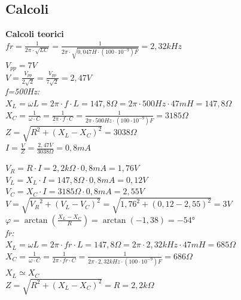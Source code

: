 \documentclass[12pt]{article}
\begin{document}
    \subsection{Calcoli}
    \begin{center}
        
    \textbf{Calcoli teorici}\\

$fr=\frac{1}{2\pi\cdot\sqrt{LC}}=\frac{1}{2\pi\cdot\sqrt{0,047 H \cdot (100 \cdot 10^{-9})F }}=2,32kHz$\\
\vspace{5mm}
$V_{pp}=7V$\\
$V=\frac{V_{pp}}{2\sqrt{2}}=\frac{V_{pp}}{7\sqrt{2}}=2,47V$\\
\vspace{10mm}
\textit{f=500Hz:}\\

\vspace{5mm}
$X_L=\omega L=2 \pi\cdot f \cdot L=147,8 \Omega=2 \pi\cdot 500Hz \cdot 47mH=147,8 \Omega$\\
$X_C=\frac{1}{\omega \cdot C}=\frac{1}{2 \pi\cdot f  \cdot C}=\frac{1}{2 \pi\cdot 500Hz  \cdot (100 \cdot 10^{-9})F}=3185 \Omega$\\
$Z=\sqrt{R^2+(X_L-X_C)^2}=3038\Omega$\\


\vspace{5mm}
$I=\frac{V}{Z}=\frac{2,47V}{3038\Omega}=0,8mA$\\

\vspace{5mm}

$V_R=R\cdot I=2,2k\Omega \cdot 0,8mA=1,76V$\\
$V_L=X_L\cdot I=147,8 \Omega \cdot 0,8mA=0,12V$\\
$V_C=X_C\cdot I=3185 \Omega\cdot 0,8mA=2,55V$\\
$V=\sqrt{{V_R}^2+(V_L-V_C)^2}=\sqrt{1,76^2+(0,12-2,55)^2}=3V$\\

\vspace{5mm}
$\varphi=\arctan(\frac{X_L - X_C}{R})=\arctan(-1,38)=-54$°\\

\vspace{10mm}
\textit{fr:}\\
\vspace{5mm}
$X_L=\omega L=2 \pi\cdot fr \cdot L=147,8 \Omega=2 \pi\cdot 2,32kHz \cdot 47mH=685 \Omega$\\
$X_C=\frac{1}{\omega \cdot C}=\frac{1}{2 \pi\cdot fr  \cdot C}=\frac{1}{2 \pi\cdot 2,32kHz  \cdot (100 \cdot 10^{-9})F}=686 \Omega$\\
$X_L\simeq X_C$\\
$Z=\sqrt{R^2+(X_L-X_C)^2}=R=2,2 k\Omega$\\



\end{center}
\end{document}
